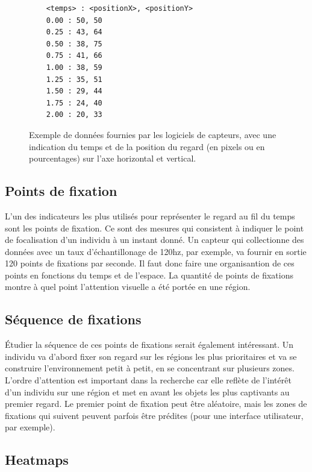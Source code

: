 \documentclass[12pt]{article}
\begin{document}
\begin{figure}[htpb]
  \begin{verbatim}
    <temps> : <positionX>, <positionY>
    0.00 : 50, 50
    0.25 : 43, 64
    0.50 : 38, 75
    0.75 : 41, 66
    1.00 : 38, 59
    1.25 : 35, 51
    1.50 : 29, 44
    1.75 : 24, 40
    2.00 : 20, 33
  \end{verbatim}
  \caption{Exemple de données fournies par les logiciels de capteurs, avec une
    indication du temps et de la position du regard (en pixels ou en
    pourcentages) sur l'axe horizontal et vertical.}
  \label{fiées de façon plus explicite.}
\end{figure}

\subsection{Points de fixation}

L'un des indicateurs les plus utilisés pour représenter le regard au fil du
temps sont les points de fixation. Ce sont des mesures qui consistent à indiquer
le point de focalisation d'un individu à un instant donné. Un capteur qui
collectionne des données avec un taux d'échantillonage de 120hz, par exemple, va
fournir en sortie 120 points de fixations par seconde. Il faut donc faire une
organisantion de ces points en fonctions du temps et de l'espace. La quantité de
points de fixations montre à quel point l'attention visuelle a été portée en une
région.

\subsection{Séquence de fixations}

Étudier la séquence de ces points de fixations serait également intéressant. Un
individu va d'abord fixer son regard sur les régions les plus prioritaires et va
se construire l'environnement petit à petit, en se concentrant sur plusieurs
zones. L'ordre d'attention est important dans la recherche car elle reflète de
l'intérêt d'un individu sur une région et met en avant les objets les plus
captivants au premier regard. Le premier point de fixation peut être aléatoire,
mais les zones de fixations qui suivent peuvent parfois être prédites (pour
une interface utilisateur, par exemple).

\subsection{Heatmaps}
\end{document}
